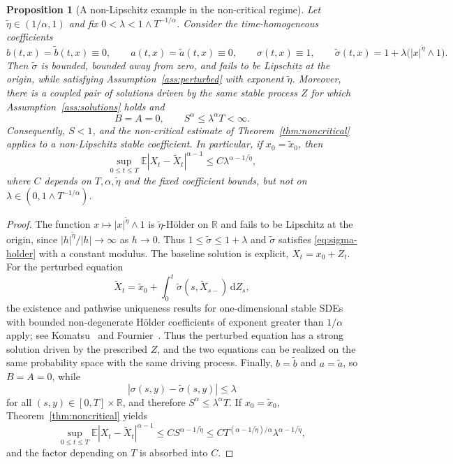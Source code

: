 \documentclass[11pt]{article}
\newtheorem{proposition}[theorem]{Proposition}
\newcommand{\R}{\mathbb{R}}
\newcommand{\E}{\mathbb{E}}
\newcommand{\1}{\mathbf{1}}
\newcommand{\dd}{\,\mathrm{d}}
\newcommand{\wt}{\tilde}
\begin{document}
\begin{proposition}[A non-Lipschitz example in the non-critical regime]\label{prop:nonlipschitz-example}
Let $\wt\eta\in(1/\alpha,1)$ and fix $0<\lambda<1\wedge T^{-1/\alpha}$. Consider the time-homogeneous coefficients
\[
  b(t,x)=\wt b(t,x)\equiv0,
  \qquad
  a(t,x)=\wt a(t,x)\equiv0,
  \qquad
  \sigma(t,x)\equiv1,
  \qquad
  \wt\sigma(t,x)=1+\lambda\bigl(|x|^{\wt\eta}\wedge1\bigr).
\]
Then $\wt\sigma$ is bounded, bounded away from zero, and fails to be Lipschitz at the origin, while satisfying Assumption~\ref{ass:perturbed} with exponent $\wt\eta$. Moreover, there is a coupled pair of solutions driven by the same stable process $Z$ for which Assumption~\ref{ass:solutions} holds and
\[
  B=A=0,
  \qquad
  S^\alpha\le \lambda^\alpha T<\infty.
\]
Consequently, $S<1$, and the non-critical estimate of Theorem~\ref{thm:noncritical} applies to a non-Lipschitz stable coefficient. In particular, if $x_0=\wt x_0$, then
\[
  \sup_{0\le t\le T}\E|X_t-\wt X_t|^{\alpha-1}
  \le C\lambda^{\alpha-1/\wt\eta},
\]
where $C$ depends on $T,\alpha,\wt\eta$ and the fixed coefficient bounds, but not on $\lambda\in(0,1\wedge T^{-1/\alpha})$.
\end{proposition}

\begin{proof}
The function $x\mapsto |x|^{\wt\eta}\wedge1$ is $\wt\eta$-H\"older on $\R$ and fails to be Lipschitz at the origin, since $|h|^{\wt\eta}/|h|\to\infty$ as $h\to0$. Thus $1\le \wt\sigma\le1+\lambda$ and $\wt\sigma$ satisfies \eqref{eq:sigma-holder} with a constant modulus. The baseline solution is explicit, $X_t=x_0+Z_t$. For the perturbed equation
\[
  \wt X_t=\wt x_0+\int_0^t \wt\sigma(s,\wt X_{s-})\dd Z_s,
\]
the existence and pathwise uniqueness results for one-dimensional stable SDEs with bounded non-degenerate H\"older coefficients of exponent greater than $1/\alpha$ apply; see Komatsu~\cite{Komatsu1982} and Fournier~\cite{Fournier2013}. Thus the perturbed equation has a strong solution driven by the prescribed $Z$, and the two equations can be realized on the same probability space with the same driving process. Finally, $b=\wt b$ and $a=\wt a$, so $B=A=0$, while
\[
  |\sigma(s,y)-\wt\sigma(s,y)|\le \lambda
\]
for all $(s,y)\in[0,T]\times\R$, and therefore $S^\alpha\le \lambda^\alpha T$. If $x_0=\wt x_0$, Theorem~\ref{thm:noncritical} yields
\[
  \sup_{0\le t\le T}\E|X_t-\wt X_t|^{\alpha-1}
  \le C S^{\alpha-1/\wt\eta}
  \le C T^{(\alpha-1/\wt\eta)/\alpha}\lambda^{\alpha-1/\wt\eta},
\]
and the factor depending on $T$ is absorbed into $C$.

\end{proof}
\end{document}
